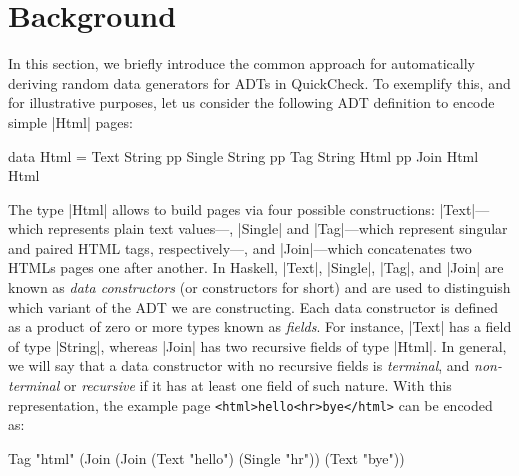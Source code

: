 \section{Background} \label{sec:randomtesting}

In this section, we briefly introduce the common approach for automatically
deriving random data generators for ADTs in QuickCheck.
%
%
%
To exemplify this, and for illustrative purposes, let us consider the following
ADT definition to encode simple |Html| pages:
%
\begin{code}
data Html  =   Text    String
           pp  Single  String
           pp  Tag     String  Html
           pp  Join    Html    Html

\end{code}
%
The type |Html| allows to build pages via four possible constructions:
|Text|---which represents plain text values---, |Single| and |Tag|---which
represent singular and paired HTML tags, respectively---, and |Join|---which
concatenates two HTMLs pages one after another.
%
In Haskell, |Text|, |Single|, |Tag|, and |Join| are known as \emph{data
  constructors} (or constructors for short) and are used to distinguish which
variant of the ADT we are constructing.
%
Each data constructor is defined as a product of zero or more types known as
\emph{fields}.
%
For instance, |Text| has a field of type |String|, whereas |Join| has two
recursive fields of type |Html|.
%
In general, we will say that a data constructor with no recursive fields is
\emph{terminal}, and \emph{non-terminal} or \emph{recursive} if it has at least
one field of such nature.
%
With this representation, the example page \texttt{<html>hello<hr>bye</html>}
can be encoded as:
%
\begin{code}
Tag "html" (Join (Join
  (Text "hello") (Single "hr")) (Text "bye"))
\end{code}
%

